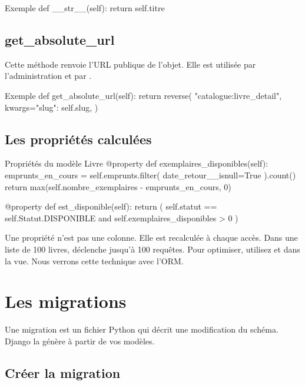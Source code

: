 \begin{codebox}[python]{Exemple}
def __str__(self):
    return self.titre
\end{codebox}

\subsection{get\_absolute\_url}

Cette méthode renvoie l'URL publique de l'objet. Elle est utilisée par
l'administration et par .

\begin{codebox}[python]{Exemple}
def get_absolute_url(self):
    return reverse(
        "catalogue:livre_detail",
        kwargs={"slug": self.slug},
    )
\end{codebox}

\subsection{Les propriétés calculées}

\begin{codebox}[python]{Propriétés du modèle Livre}
@property
def exemplaires_disponibles(self):
    emprunts_en_cours = self.emprunts.filter(
        date_retour__isnull=True
    ).count()
    return max(self.nombre_exemplaires - emprunts_en_cours, 0)

@property
def est_disponible(self):
    return (
        self.statut == self.Statut.DISPONIBLE
        and self.exemplaires_disponibles > 0
    )
\end{codebox}

\begin{attention}
Une propriété n'est pas une colonne. Elle est recalculée à chaque accès. Dans une
liste de 100 livres,  déclenche jusqu'à 100
requêtes. Pour optimiser, utilisez  et  dans la vue.
Nous verrons cette technique avec l'ORM.
\end{attention}

\section{Les migrations}

Une migration est un fichier Python qui décrit une modification du schéma. Django
la génère à partir de vos modèles.

\subsection{Créer la migration}

